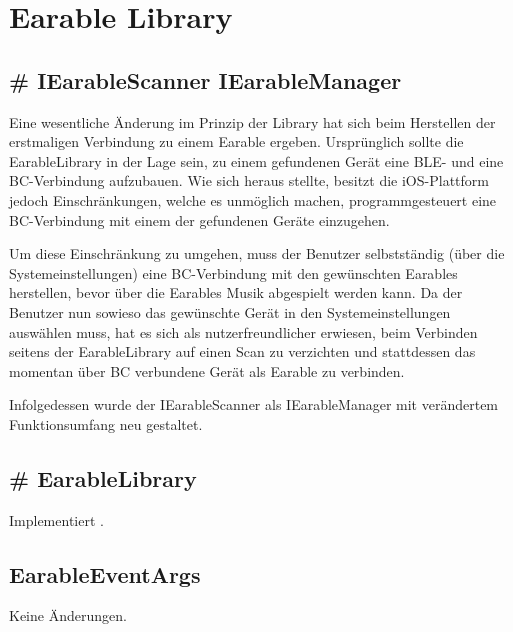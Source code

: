\documentclass[../implementierung.tex]{subfiles}
\begin{document}
\section{Earable Library}

\subsection{\# IEarableScanner \changeto{} IEarableManager}
	Eine wesentliche Änderung im Prinzip der Library hat sich beim Herstellen der erstmaligen Verbindung zu einem Earable ergeben.
	Ursprünglich sollte die EarableLibrary in der Lage sein, zu einem gefundenen Gerät eine BLE- und eine BC-Verbindung aufzubauen.
	Wie sich heraus stellte, besitzt die iOS-Plattform jedoch Einschränkungen, welche es unmöglich machen, programmgesteuert eine BC-Verbindung
	mit einem der gefundenen Geräte einzugehen.

	Um diese Einschränkung zu umgehen, muss der Benutzer selbstständig (über die Systemeinstellungen) eine BC-Verbindung mit
	den gewünschten Earables herstellen, bevor über die Earables Musik abgespielt werden kann.
	Da der Benutzer nun sowieso das gewünschte Gerät in den Systemeinstellungen auswählen muss, hat es sich als nutzerfreundlicher erwiesen,
	beim Verbinden seitens der EarableLibrary auf einen Scan zu verzichten und stattdessen das momentan über BC verbundene Gerät als Earable zu verbinden.

	Infolgedessen wurde der IEarableScanner als IEarableManager mit verändertem Funktionsumfang neu gestaltet.
	\begin{itemize}
	\end{itemize}

\subsection{\# EarableLibrary}
	Implementiert .

\subsection{EarableEventArgs}
	Keine Änderungen.
\end{document}

